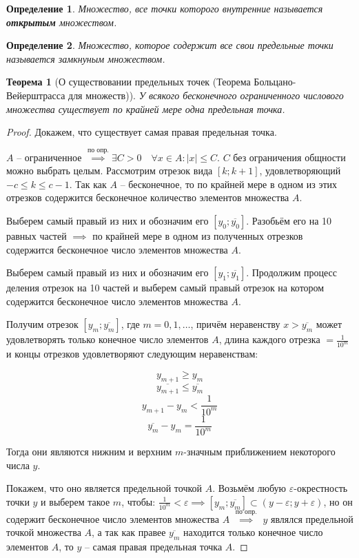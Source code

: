 \documentclass[a4paper,oneside]{article}
\newcommand{\bydef}{\stackrel{\text{по опр.}}{\implies}} %
\newtheorem{theorem}{Теорема}[subsection]
\newtheorem{definition}{Определение}[subsection]
\begin{document}
\begin{definition}
    Множество, все точки которого внутренние называется \textbf{открытым} множеством.    
\end{definition}

\begin{definition}
    Множество, которое содержит все свои предельные точки называется замкнуным множеством.    
\end{definition}

\begin{theorem}[О существовании предельных точек (Теорема Больцано-Вейерштрасса для множеств)]
    У всякого бесконечного ограниченного числового множества существует по крайней мере
    одна предельная точка.    
\end{theorem}

\begin{proof}
    Докажем, что существует самая правая предельная точка.

    $A$ -- ограниченное $\bydef \exists C > 0 \quad
    \forall x \in A: |x| \le C$.
    $C$ без ограничения общности можно выбрать целым.
    Рассмотрим отрезок вида $[k;k+1]$, удовлетворяющий $-c \le k \le c - 1$.
    Так как $A$ -- бесконечное, то по крайней мере в одном из этих отрезков содержится
    бесконечное количество элементов множества $A$.
    
    Выберем самый правый из них и обозначим его $[y_0;\overline{y_0}]$.
    Разобьём его на 10 равных частей $\implies$ по крайней мере в одном из
    полученных отрезков содержится бесконечное число элементов множества $A$.
    
    Выберем самый правый из них и обозначим его $[y_1;\overline{y_1}]$.
    Продолжим процесс деления отрезок на 10 частей и выберем самый правый отрезок
    на котором содержится бесконечное число элементов множества $A$.
    
    Получим отрезок $[y_m;\overline{y_m}]$, где $m = 0,1,\dots$, причём неравенству
    $x > \overline{y_m}$ может удовлетворять только конечное число элементов $A$,
    длина каждого отрезка $= \frac{1}{10^m}$ и концы отрезков удовлетворяют
    следующим неравенствам:
    
    \[y_{m+1} \ge y_m\]
    \[\overline{y_{m+1}} \le \overline{y_m}\]
    \[y_{m+1} - y_m < \frac{1}{10^m}\]
    \[\overline{y_m} - y_m = \frac{1}{10^m}\]
    
    Тогда они являются нижним и верхним $m$-значным приближением некоторого числа $y$.
    
    Покажем, что оно является предельной точкой $A$. Возьмём любую $\varepsilon$-окрестность
    точки $y$ и выберем такое $m$, чтобы: 
    $\frac{1}{10^m} < \varepsilon \implies [y_m;\overline{y_m}] \subset 
    (y - \varepsilon; y + \varepsilon)$, но он содержит бесконечное число элементов
    множества $A$ $\bydef$ $y$ являлся предельной точкой
    множества $A$, а так как правее $\overline{y_m}$ находится только конечное число
    элементов $A$, то $y$ -- самая правая предельная точка $A$.
\end{proof}
\end{document}
